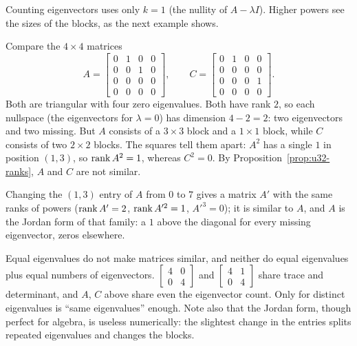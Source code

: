 Counting eigenvectors uses only $k=1$ (the nullity of $A-\lambda I$). Higher powers see the
sizes of the blocks, as the next example shows.

\begin{example}\label{ex:u32-4by4}
Compare the $4\times4$ matrices
\[
  A=\begin{bmatrix}0&1&0&0\\0&0&1&0\\0&0&0&0\\0&0&0&0\end{bmatrix},\qquad
  C=\begin{bmatrix}0&1&0&0\\0&0&0&0\\0&0&0&1\\0&0&0&0\end{bmatrix}.
\]
Both are triangular with four zero eigenvalues. Both have rank $2$, so each nullspace (the
eigenvectors for $\lambda=0$) has dimension $4-2=2$: two eigenvectors and two missing. But $A$
consists of a $3\times3$ block and a $1\times1$ block, while $C$ consists of two $2\times2$ blocks.
The squares tell them apart: $A^2$ has a single $1$ in position $(1,3)$, so $\operatorname{rank} A^2=1$,
whereas $C^2=0$. By Proposition~\ref{prop:u32-ranks}, $A$ and $C$ are not similar.

Changing the $(1,3)$ entry of $A$ from $0$ to $7$ gives a matrix $A'$ with the same ranks of
powers ($\operatorname{rank} A'=2$, $\operatorname{rank} A'^2=1$, $A'^3=0$); it is similar to $A$, and $A$ is the Jordan form of
that family: a $1$ above the diagonal for every missing eigenvector, zeros elsewhere.
\end{example}

\begin{trap}
Equal eigenvalues do not make matrices similar, and neither do equal eigenvalues plus equal
numbers of eigenvectors. $\left[\begin{smallmatrix}4&0\\0&4\end{smallmatrix}\right]$ and
$\left[\begin{smallmatrix}4&1\\0&4\end{smallmatrix}\right]$ share trace and determinant, and $A$, $C$ above
share even the eigenvector count. Only for distinct eigenvalues is ``same eigenvalues'' enough.
Note also that the Jordan form, though perfect for algebra, is useless numerically: the
slightest change in the entries splits repeated eigenvalues and changes the blocks.
\end{trap}

